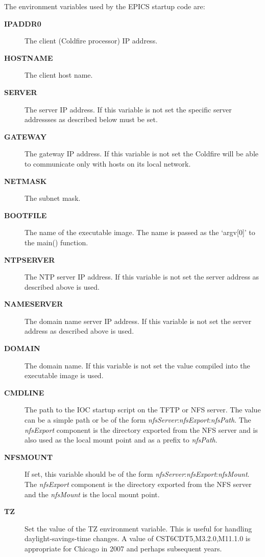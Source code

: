 \documentclass{report}
\begin{document}
The environment variables used by the EPICS startup code are:
\begin{description}
\item[{\bf IPADDR0}]
The client (Coldfire processor) IP address.

\item[{\bf HOSTNAME}]
The client host name.

\item[{\bf SERVER}]
The server IP address.  If this variable is not set the specific server
addressses as described below must be set.

\item[{\bf GATEWAY}]
The gateway IP address.  If this variable is not set the Coldfire will be
able to communicate only with hosts on its local network.

\item[{\bf NETMASK}]
The subnet mask.

\item[{\bf BOOTFILE}]
The name of the executable image.
The name is passed as the `argv[0]' to the main() function.

\item[{\bf NTPSERVER}]
The NTP server IP address.  If this variable is not set the server address as described above is used.

\item[{\bf NAMESERVER}]
The domain name server IP address.  If this variable is not set the server address as described above is used.

\item[{\bf DOMAIN}]
The domain name.  If this variable is not set the value compiled into the executable image is used.

\item[{\bf CMDLINE}]
The path to the IOC startup script on the TFTP or NFS server. 
The value can be a simple path or be of the form
\textit{nfsServer}:\textit{nfsExport}:\textit{nfsPath}.
The \textit{nfsExport} component is the directory exported from the NFS server and is also used as the local mount point and as a prefix to \textit{nfsPath}.

\item[{\bf NFSMOUNT}]
If set, this variable should be of the form
\textit{nfsServer}:\textit{nfsExport}:\textit{nfsMount}.
The \textit{nfsExport} component is the directory exported from the NFS server
and the \textit{nfsMount} is the local mount point.

\item[{\bf TZ}]
Set the value of the TZ environment variable.
This is useful for handling daylight-savings-time changes.  A value of
CST6CDT5,M3.2.0,M11.1.0 is appropriate for Chicago in 2007 and perhaps subsequent years.

\end{description}
\end{document}
